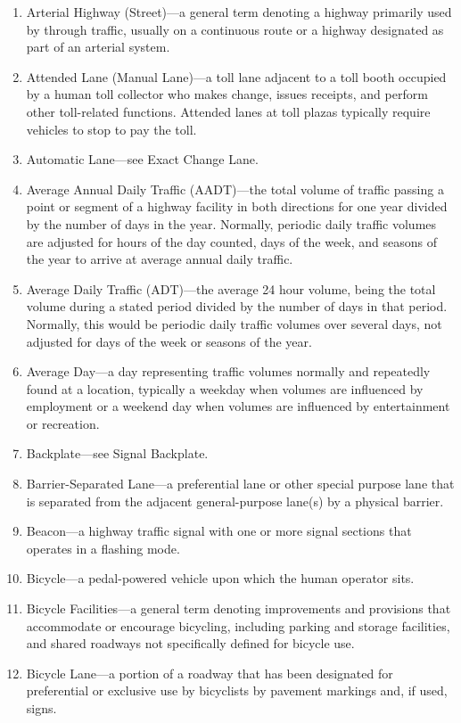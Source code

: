 \documentclass[9pt]{memoir}
\begin{document}
{\begin{enumerate}[label=\arabic*., ref=\arabic*]
\item Arterial Highway (Street)---a general term denoting a highway primarily used by through traffic, usually on a continuous route or a highway designated as part of an arterial system.
\item Attended Lane (Manual Lane)---a toll lane adjacent to a toll booth occupied by a human toll collector who makes change, issues receipts, and perform other toll-related functions. Attended lanes at toll plazas typically require vehicles to stop to pay the toll.
\item Automatic Lane---see Exact Change Lane.
\item Average Annual Daily Traffic (AADT)---the total volume of traffic passing a point or segment of a highway facility in both directions for one year divided by the number of days in the year. Normally, periodic daily traffic volumes are adjusted for hours of the day counted, days of the week, and seasons of the year to arrive at average annual daily traffic.
\item Average Daily Traffic (ADT)---the average 24 hour volume, being the total volume during a stated period divided by the number of days in that period. Normally, this would be periodic daily traffic volumes over several days, not adjusted for days of the week or seasons of the year.
\item Average Day---a day representing traffic volumes normally and repeatedly found at a location, typically a weekday when volumes are influenced by employment or a weekend day when volumes are influenced by entertainment or recreation.
\item Backplate---see Signal Backplate.
\item Barrier-Separated Lane---a preferential lane or other special purpose lane that is separated from the adjacent general-purpose lane(s) by a physical barrier.
\item Beacon---a highway traffic signal with one or more signal sections that operates in a flashing mode.
\item Bicycle---a pedal-powered vehicle upon which the human operator sits.
\item Bicycle Facilities---a general term denoting improvements and provisions that accommodate or encourage bicycling, including parking and storage facilities, and shared roadways not specifically defined for bicycle use.
\item Bicycle Lane---a portion of a roadway that has been designated for preferential or exclusive use by bicyclists by pavement markings and, if used, signs.

\end{enumerate}}
\end{document}
